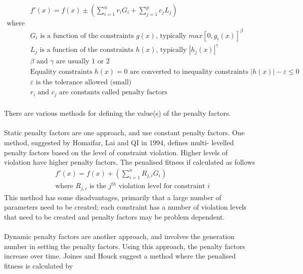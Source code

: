 \begin{equation}
  \begin{split}
    &f'(x) = f(x) \pm (\sum_{i=1}^{n}{r_{i}G_{i}} + \sum_{j=1}^{p}{c_{j}L_{j}}) \\
    \text{where} \\
    &G_{i}\text{ is a function of the constraints }g(x)\text{, typically }max[0, g_{i}(x)]^{\beta} \\
    &L_{j}\text{ is a function of the constraints }h(x)\text{, typically }|h_{j}(x)|^{\gamma} \\
    &\beta\text{ and }\gamma\text{ are usually 1 or 2} \\
    &\text{Equality constraints }h(x) = 0\text{ are converted to inequality constraints }|h(x)| - \varepsilon \le 0 \\
    &\varepsilon\text{ is the tolerance allowed (small)} \\
    &r_{i}\text{ and }c_{j}\text{ are constants called penalty factors}
  \end{split}
\end{equation}
\\There are various methods for defining the value(s) of the penalty factors.
\\\\Static penalty factors are one approach, and use constant penalty factors. One method, suggested by Homaifar, Lai and QI in 1994, defines multi- levelled penalty factors based on the level of constraint violation. Higher levels of violation have higher penalty factors. The penalised fitness if calculated as follows\cite{4-ga, constraints, gecco}
\begin{equation}
  \begin{split}
    &f'(x) = f(x) + (\sum_{i=1}^{n}{R_{j, i}G_{i}}) \\
    &\text{where }R_{j, i}\text{ is the }j^{th}\text{ violation level for constraint }i
  \end{split}
\end{equation}
This method has some disadvantages, primarily that a large number of parameters need to be created; each constraint has a number of violation levels that need to be created and penalty factors may be problem dependent\cite{constraints, gecco}.
\\\\Dynamic penalty factors are another approach, and involves the generation number in setting the penalty factors. Using this approach, the penalty factors increase over time. Joines and Houck suggest a method where the penalised fitness is calculated by\cite{4-ga, esc, constraints, gecco}
